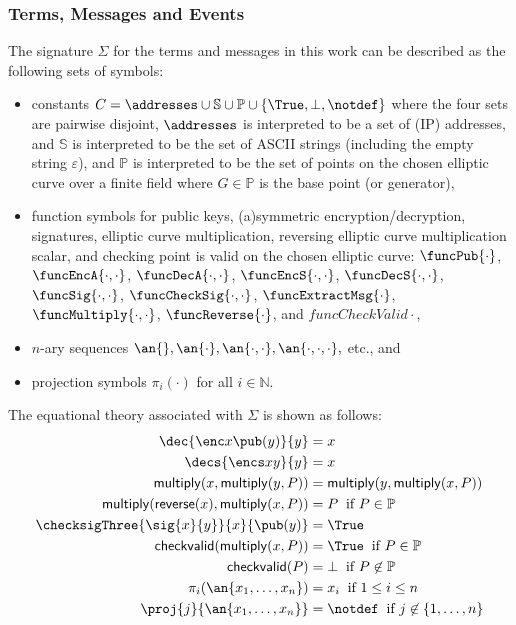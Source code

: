 \subsubsection{Terms, Messages and Events}
The signature $\Sigma$ for the terms and messages in this work can be described as the following sets of symbols:
\begin{itemize}
\item constants $C = \addresses \cup \mathbb{S} \cup \mathbb{P} \cup \{ \True, \bot, \notdef \}$ where the four sets are pairwise disjoint, $\addresses$ is interpreted to be a set of (IP) addresses, and $\mathbb{S}$ is interpreted to be the set of ASCII strings (including the empty string $\varepsilon$), and $\mathbb{P}$ is interpreted to be the set of points on the chosen elliptic curve over a finite field where $G \in \mathbb{P}$ is the base point (or generator), 
\item function symbols for public keys, (a)symmetric  encryption/decryption, signatures, elliptic curve multiplication, reversing elliptic curve multiplication scalar, and checking point is valid on the chosen elliptic curve: 
	$\funcPub{\cdot}$, $\funcEncA{\cdot, \cdot}$,
	$\funcDecA{\cdot, \cdot}$, $\funcEncS{\cdot, \cdot}$,
	$\funcDecS{\cdot, \cdot}$, $\funcSig{\cdot, \cdot}$,
	$\funcCheckSig{\cdot, \cdot}$, $\funcExtractMsg{\cdot}$,
	$\funcMultiply{\cdot, \cdot}$, $\funcReverse{\cdot}$,
	and $funcCheckValid{\cdot}$,
\item $n$-ary sequences $\an{}, \an{\cdot}, \an{\cdot, \cdot}, \an{\cdot, \cdot, \cdot},$ etc., and
\item projection symbols $\pi_i(\cdot)$ for all $i \in \mathbb{N}$.
\end{itemize}

The equational theory associated with $\Sigma$ is shown as follows:
\begin{align*}
\dec{\enc x{\pub(y)}}{y} &= x\\
\decs{\encs x{y}}{y} &= x\\
\mathsf{multiply}(x, \mathsf{multiply}(y, P)) &= \mathsf{multiply}(y, \mathsf{multiply}(x, P))\\
\mathsf{multiply}(\mathsf{reverse}(x), \mathsf{multiply}(x, P)) &= P \text{\;\;if\ } P \in \mathbb{P}\\
\checksigThree{\sig{x}{y}}{x}{\pub(y)} &= \True\\
\mathsf{checkvalid}(\mathsf{multiply}(x, P)) &= \True  \text{\;\;if\ } P \in \mathbb{P}\\
\mathsf{checkvalid}(P) &= \bot  \text{\;\;if\ } P \not\in \mathbb{P}\\
\pi_i(\an{x_1,\dots,x_n}) &= x_i \text{\;\;if\ } 1 \leq i \leq n \\
\proj{j}{\an{x_1,\dots,x_n}} &= \notdef \text{\;\;if\ } j
\not\in \{1,\dots,n\}
\end{align*}

